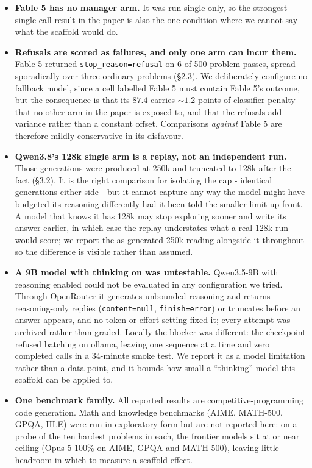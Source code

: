 \documentclass[11pt]{article}
\begin{document}
\begin{itemize}
  \item \textbf{Fable 5 has no manager arm.} It was run single-only, so the strongest
  single-call result in the paper is also the one condition where we cannot say what the
  scaffold would do.

  \item \textbf{Refusals are scored as failures, and only one arm can incur them.} Fable 5
  returned \texttt{stop\_reason=refusal} on 6 of 500 problem-passes, spread sporadically
  over three ordinary problems (\S2.3). We deliberately configure no fallback model, since
  a cell labelled Fable 5 must contain Fable 5's outcome, but the consequence is that its
  $87.4$ carries ${\sim}1.2$ points of classifier penalty that no other arm in the paper is
  exposed to, and that the refusals add variance rather than a constant offset. Comparisons
  \textit{against} Fable 5 are therefore mildly conservative in its disfavour.

  \item \textbf{Qwen3.8's 128k single arm is a replay, not an independent run.} Those
  generations were produced at 250k and truncated to 128k after the fact (\S3.2). It is the
  right comparison for isolating the cap - identical generations either side - but it cannot
  capture any way the model might have budgeted its reasoning differently had it been told
  the smaller limit up front. A model that knows it has 128k may stop exploring sooner and
  write its answer earlier, in which case the replay understates what a real 128k run would
  score; we report the as-generated 250k reading alongside it throughout so the difference
  is visible rather than assumed.

  \item \textbf{A 9B model with thinking on was untestable.} Qwen3.5-9B with reasoning
  enabled could not be evaluated in any configuration we tried. Through OpenRouter it
  generates unbounded reasoning and returns reasoning-only replies
  (\texttt{content=null}, \texttt{finish=error}) or truncates before an answer appears,
  and no token or effort setting fixed it; every attempt was archived rather than graded.
  Locally the blocker was different: the checkpoint refused batching on ollama, leaving
  one sequence at a time and zero completed calls in a 34-minute smoke test. We report it
  as a model limitation rather than a data point, and it bounds how small a ``thinking''
  model this scaffold can be applied to.

  \item \textbf{One benchmark family.} All reported results are competitive-programming
  code generation. Math and knowledge benchmarks (AIME, MATH-500, GPQA, HLE) were run in
  exploratory form but are not reported here: on a probe of the ten hardest problems in
  each, the frontier models sit at or near ceiling (Opus-5 100\% on AIME, GPQA and
  MATH-500), leaving little headroom in which to measure a scaffold effect.
\end{itemize}
\end{document}

